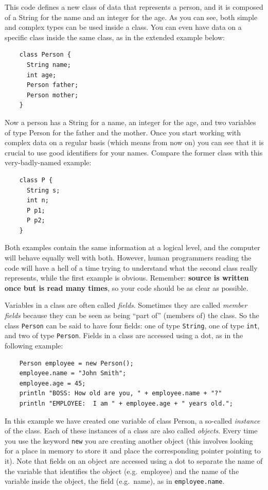 This code defines a new class of data that represents a person, and
it is composed of a String for the name and an integer for the age. As
you can see, both simple and complex types can be used inside a
class. You can even have data on a specific class inside the same
class, as in the extended example below: 

\begin{verbatim}
    class Person {
      String name;
      int age;
      Person father;
      Person mother;
    }
\end{verbatim}

Now a person has a String for a name, an integer for the age, and two
variables of type Person for the father and the mother. Once you start
working with complex data on a regular basis (which means from now on)
you can see that it is crucial to use good identifiers for your
names. Compare the former class with this very-badly-named example: 

\begin{verbatim}
    class P {
      String s;
      int n;
      P p1;
      P p2;
    }
\end{verbatim}

Both examples contain the same information at a logical level, and the
computer will behave equally well with both. However, human
programmers reading the code will have a hell of a time trying to
understand what the second class really represents, while the first
example is obvious. Remember: \textbf{source is written once but is read many
times}, so your code should be as clear as possible.

Variables in a class are often called \emph{fields}. Sometimes they
are called \emph{member fields} because they can be seen as being
``part of'' (members of) the class. So the class \verb+Person+ can be
said to have four fields: one of type \verb+String+, one of type
\verb+int+, and two of type \verb+Person+. Fields in a class are
accessed using a dot, as in the following example: 

\begin{verbatim}
    Person employee = new Person();
    employee.name = "John Smith";
    employee.age = 45;
    println "BOSS: How old are you, " + employee.name + "?"
    println "EMPLOYEE:  I am " + employee.age + " years old.";
\end{verbatim}

In this example we have created one variable of class Person, a
so-called 
\emph{instance} of the class. Each of these instances of a class
are also called \emph{objects}. Every time you use the
keyword \verb+new+ you are creating another object (this involves
looking for a place in memory to store it and place the corresponding
pointer pointing to it). 
Note that fields on an object are accessed using a dot to
separate the name of the variable that identifies the object
(e.g.~employee) and the name of the variable inside the object, the
field (e.g.~name), as in \verb+employee.name+.

